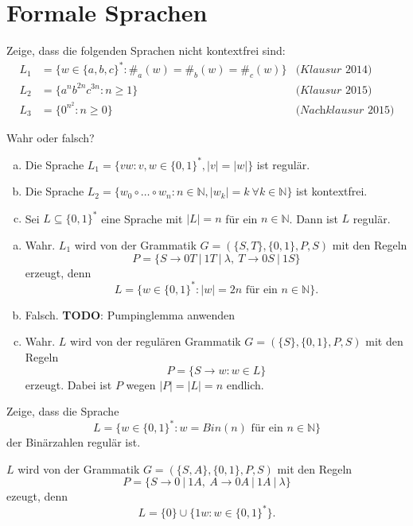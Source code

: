 \documentclass[german,headsepline]{scrartcl}
\theoremstyle{definition}
\begin{document}
	\section{Formale Sprachen}
	\begin{question}
		Zeige, dass die folgenden Sprachen nicht kontextfrei sind:
		\begin{align*}
			L_1 &= \{w\in\{a,b,c\}^*\colon \#_a(w)=\#_b(w)=\#_c(w)\} & \textit{(Klausur 2014)} \\
			L_2 &= \{a^nb^{2n}c^{3n}\colon n\geq1\} & \textit{(Klausur 2015)} \\
			L_3 &= \{0^{n^2}\colon n\geq0\} & \textit{(Nachklausur 2015)}
		\end{align*}
	\end{question}
	
	\begin{question} %
		Wahr oder falsch?
		\begin{enumerate}[(a)]
			\item Die Sprache $L_1=\{vw\colon v,w\in\{0,1\}^*,\vert v\vert=\vert w\vert\}$ ist regulär.
			\item Die Sprache $L_2=\{w_0\circ\ldots\circ w_n\colon n\in\mathbb{N},\vert w_k\vert=k~\forall k\in\mathbb{N}\}$ ist kontextfrei.
			\item Sei $L\subseteq\{0,1\}^*$ eine Sprache mit $\vert L\vert=n$ für ein $n\in\mathbb{N}$. Dann ist $L$ regulär.
		\end{enumerate}
	\end{question}
	\begin{solution}
		\begin{enumerate}[(a)]
			\item Wahr. $L_1$ wird von der Grammatik $G=(\{S,T\},\{0,1\},P,S)$ mit den Regeln
				\[P=\{S\rightarrow0T~|~1T~|~\lambda,~T\rightarrow0S~|~1S\}\]
				erzeugt, denn
				\[L=\{w\in\{0,1\}^*\colon\vert w\vert=2n\text{ für ein }n\in\mathbb{N}\}.\]
			\item Falsch. \textbf{TODO}: Pumpinglemma anwenden
			\item Wahr. $L$ wird von der regulären Grammatik $G=(\{S\},\{0,1\},P,S)$ mit den Regeln
				\[P=\{S\to w\colon w\in L\}\]
				erzeugt. Dabei ist $P$ wegen $\vert P\vert=\vert L\vert=n$ endlich.
		\end{enumerate}
	\end{solution}
	
	\begin{question}
		Zeige, dass die Sprache
		\[L=\{w\in\{0,1\}^*\colon w=Bin(n)\text{ für ein }n\in\mathbb{N}\}\]
		der Binärzahlen regulär ist.
	\end{question}
	\begin{solution}
		$L$ wird von der Grammatik $G=(\{S,A\},\{0,1\},P,S)$ mit den Regeln
		\[P=\{S\rightarrow0~|~1A,~A\rightarrow0A~|~1A~|~\lambda\}\]
		ezeugt, denn
		\[L=\{0\}\cup\{1w\colon w\in\{0,1\}^*\}\text{.}\]
	\end{solution}
	
\end{document}

